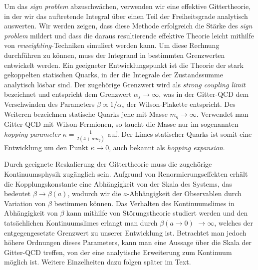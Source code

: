 {Um das \emph{sign problem} abzuschwächen, verwenden wir eine effektive
Gittertheorie, in der wir das auftretende Integral über einen Teil der
Freiheitsgrade analytisch auswerten. Wir werden zeigen, dass diese Methode
erfolgreich die Stärke des \emph{sign problem} mildert und dass die daraus
resultierende effektive Theorie leicht mithilfe von \emph{reweighting}-Tech\-ni\-ken
simuliert werden kann. Um diese Rechnung durchführen zu können, muss der
Integrand in bestimmten Grenzwerten entwickelt werden. Ein geeigneter
Entwicklungs\-punkt ist die Theorie der stark gekoppelten statischen Quarks, in
der die Integrale der Zu\-stands\-summe analytisch lösbar sind. Der zugehörige
Grenzwert wird als \emph{strong coupling limit} bezeichnet und entspricht dem
Grenzwert $\alpha_s \to \infty$, was in der Gitter-QCD dem Verschwinden des
Parameters $\beta \propto 1/\alpha_s$ der Wilson-Plakette entspricht. Des
Weiteren bezeichnen statische Quarks jene mit Masse  $m_q \to \infty$. Verwendet
man Gitter-QCD mit Wilson-Fermionen, so taucht die Masse nur im sogenannten
\emph{hopping parameter} $\kappa = \frac{1}{2(4 + a m_q)}$ auf. Der Limes
statischer Quarks ist somit eine Entwicklung um den Punkt $\kappa \to 0$, auch
bekannt als \emph{hopping expansion}.

Durch geeignete Reskalierung der Gittertheorie muss die zugehörige
Kontinuums\-phy\-sik zugänglich sein. Aufgrund von Renormierungseffekten erhält die
Kopplungskonstante eine Abhängigkeit von der Skala des Systems, das bedeutet
$\beta \to \beta(a)$, wodurch wir die $a$-Abhängigkeit der Observablen durch
Variation von $\beta$ bestimmen können. Das Verhalten des Kontinuumslimes in
Abhängigkeit von $\beta$ kann mithilfe von Störungstheorie studiert werden und
den tatsächlichen Kontinuumslimes erlangt man durch $\beta(a \to 0)$ $\to \infty$,
welches der entgegengesetzte Grenzwert zu unserer Entwicklung ist. Betrachtet
man jedoch höhere Ordnungen dieses Parameters, kann man eine Aussage über die
Skala der Gitter-QCD treffen, von der eine analytische Erweiterung zum Kontinuum
möglich ist. Weitere Einzelheiten dazu folgen später im Text.

}
